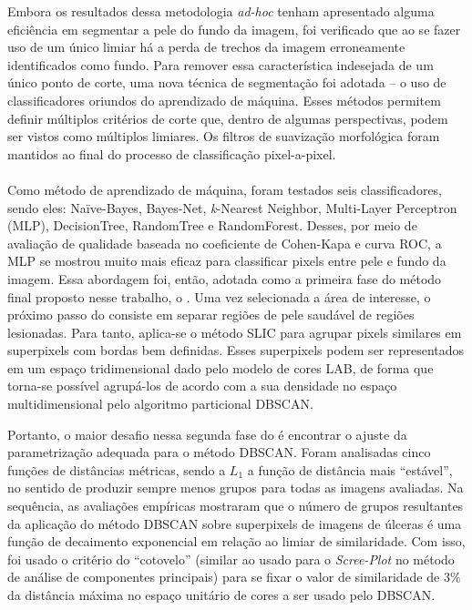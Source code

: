 Embora os resultados dessa metodologia \textit{ad-hoc} tenham apresentado alguma eficiência em segmentar a pele do fundo da imagem, foi verificado que ao se fazer uso de um único limiar há a perda de trechos da imagem erroneamente identificados como fundo.
Para remover essa característica indesejada de um único ponto de corte, uma nova técnica de segmentação foi adotada -- o uso de classificadores oriundos do aprendizado de máquina.
Esses métodos permitem definir múltiplos critérios de corte que, dentro de algumas perspectivas, podem ser vistos como múltiplos limiares.
Os filtros de suavização morfológica foram mantidos ao final do processo de classificação pixel-a-pixel.\\~\\

Como método de aprendizado de máquina, foram testados seis classificadores, sendo eles: Na\"{i}ve-Bayes, Bayes-Net, \textit{k}-Nearest Neighbor, Multi-Layer Perceptron (MLP), DecisionTree, RandomTree e RandomForest. 
Desses, por meio de avaliação de qualidade baseada no coeficiente de Cohen-Kapa e curva ROC, a MLP se mostrou muito mais eficaz para classificar pixels entre pele e fundo da imagem.
Essa abordagem foi, então, adotada como a primeira fase do método final proposto nesse trabalho, o \system.
Uma vez selecionada a área de interesse, o próximo passo do \system consiste em separar regiões de pele saudável de regiões lesionadas.
Para tanto, aplica-se o método SLIC para agrupar pixels similares em superpixels com bordas bem definidas.
Esses superpixels podem ser representados em um espaço tridimensional dado pelo modelo de cores LAB, de forma que torna-se possível agrupá-los de acordo com a sua densidade no espaço multidimensional pelo algoritmo particional DBSCAN.

Portanto, o maior desafio nessa segunda fase do \system é encontrar o ajuste da parametrização adequada para o método DBSCAN.
Foram analisadas cinco funções de distâncias métricas, sendo a $L_1$ a função de distância mais ``estável'', no sentido de produzir sempre menos grupos para todas as imagens avaliadas.
Na sequência, as avaliações empíricas mostraram que o número de grupos resultantes da aplicação do método DBSCAN sobre superpixels de imagens de úlceras é uma função de decaimento exponencial em relação ao limiar de similaridade.
Com isso, foi usado o critério do ``cotovelo'' (similar ao usado para o \textit{Scree-Plot} no método de análise de componentes principais) para se fixar o valor de similaridade de $3\%$ da distância máxima no espaço unitário de cores a ser usado pelo DBSCAN.

